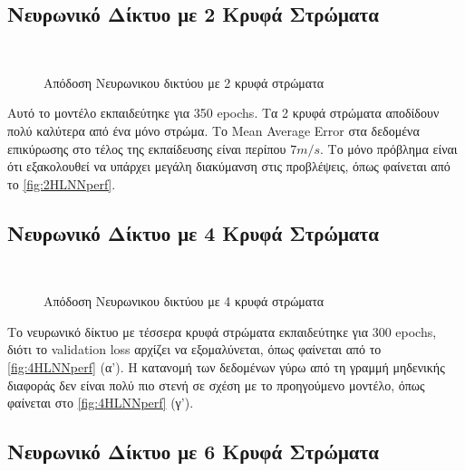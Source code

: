 \subsection{Νευρωνικό Δίκτυο με 2 Κρυφά Στρώματα}
\label{hidden-layer-neural-network-1}
\begin{figure}[H]
  \centering
   \\

  \caption{Απόδοση Νευρωνικου δικτύου με 2 κρυφά στρώματα}
  \label{fig:2HLNNperf}
\end{figure}
Αυτό το μοντέλο εκπαιδεύτηκε για 350 \textlatin{epochs}. Τα 2 κρυφά στρώματα αποδίδουν πολύ καλύτερα από ένα μόνο στρώμα. Το \textlatin{Mean Average Error} στα δεδομένα επικύρωσης στο τέλος της εκπαίδευσης είναι περίπου $7 m/s$. Το μόνο πρόβλημα είναι ότι εξακολουθεί να υπάρχει μεγάλη διακύμανση στις προβλέψεις, όπως φαίνεται από το \autoref{fig:2HLNNperf}.


\subsection{Νευρωνικό Δίκτυο με 4 Κρυφά Στρώματα}
\label{hidden-layer-neural-network-2}

\begin{figure}[H]
  \centering
   \\

  \caption{Απόδοση Νευρωνικου δικτύου με 4 κρυφά στρώματα}
  \label{fig:4HLNNperf}
\end{figure}

Το νευρωνικό δίκτυο με τέσσερα κρυφά στρώματα εκπαιδεύτηκε για 300 \textlatin{epochs}, διότι το \textlatin{validation loss} αρχίζει να εξομαλύνεται, όπως φαίνεται από το \autoref{fig:4HLNNperf} (α'). Η κατανομή των δεδομένων γύρω από τη γραμμή μηδενικής διαφοράς δεν είναι πολύ πιο στενή σε σχέση με το προηγούμενο μοντέλο, όπως φαίνεται στο \autoref{fig:4HLNNperf} (γ').


\subsection{Νευρωνικό Δίκτυο με 6 Κρυφά Στρώματα}
\label{hidden-layer-neural-network-3}

